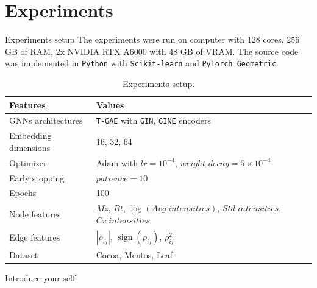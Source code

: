 \documentclass[aspectratio=169]{beamer}
\begin{document}
\section{Experiments}
    \begin{frame}{Experiments setup} %
        The experiments were run on computer with 128 cores, 256 GB of RAM, 2x NVIDIA RTX A6000 with 48 GB of VRAM. The source code was implemented in \texttt{Python} with \texttt{Scikit-learn} and \texttt{PyTorch Geometric}.

        \begin{table}[htp!]
            \footnotesize %
            \centering
            \caption{Experiments setup.}
            \begin{tabular}{@{}ll@{}}\toprule
                Features & Values \\\midrule
                GNNs architectures & \texttt{T-GAE} with \texttt{GIN}, \texttt{GINE} encoders \\
                Embedding dimensions & 16, 32, 64 \\ %
                Optimizer & Adam with $lr=10^{-4}$, $weight\_decay=5 \times 10^{-4}$ \\
                Early stopping & $patience=10$ \\
                Epochs & 100 \\\midrule
                Node features & $Mz$, $Rt$, $\operatorname{log}(Avg\; intensities)$, $Std\; intensities$, $Cv\; intensities$ \\
                Edge features & $|\rho_{ij}|$, $\operatorname{sign}(\rho_{ij})$, $\rho_{ij}^{2}$ \\\midrule
                Dataset & Cocoa, Mentos, Leaf \\\bottomrule
            \end{tabular}
        \end{table}

        \begin{note}
            {Introduce your self}
        \end{note}
    \end{frame}
\end{document}
